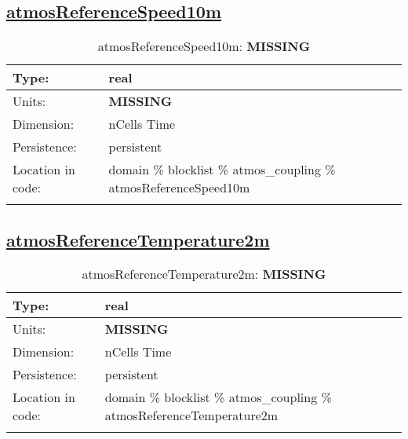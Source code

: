 \subsection[atmosReferenceSpeed10m]{\hyperref[sec:var_tab_atmos_coupling]{atmosReferenceSpeed10m}}
\label{subsec:var_sec_atmos_coupling_atmosReferenceSpeed10m}
\begin{center}
\begin{longtable}{| p{2.0in} | p{4.0in} |}
        \hline 
        Type: & real \\
        \hline 
        Units: & {\bf \color{red} MISSING} \\
        \hline 
        Dimension: & nCells Time \\
        \hline 
        Persistence: & persistent \\
        \hline 
         Location in code: & domain \% blocklist \% atmos\_coupling \% atmosReferenceSpeed10m \\
         \hline 
    \caption{atmosReferenceSpeed10m: {\bf \color{red} MISSING}}
\end{longtable}
\end{center}
\subsection[atmosReferenceTemperature2m]{\hyperref[sec:var_tab_atmos_coupling]{atmosReferenceTemperature2m}}
\label{subsec:var_sec_atmos_coupling_atmosReferenceTemperature2m}
\begin{center}
\begin{longtable}{| p{2.0in} | p{4.0in} |}
        \hline 
        Type: & real \\
        \hline 
        Units: & {\bf \color{red} MISSING} \\
        \hline 
        Dimension: & nCells Time \\
        \hline 
        Persistence: & persistent \\
        \hline 
         Location in code: & domain \% blocklist \% atmos\_coupling \% atmosReferenceTemperature2m \\
         \hline 
    \caption{atmosReferenceTemperature2m: {\bf \color{red} MISSING}}
\end{longtable}
\end{center}
